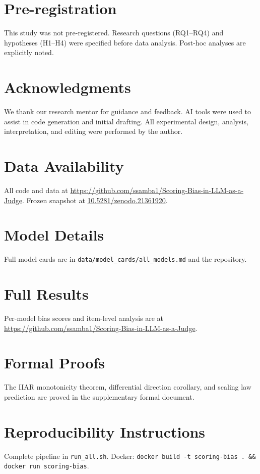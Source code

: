 \documentclass[11pt,a4paper]{article}
\begin{document}
\section*{Pre-registration}
This study was not pre-registered. Research questions (RQ1--RQ4) and hypotheses (H1--H4) were specified before data analysis. Post-hoc analyses are explicitly noted.

\section*{Acknowledgments}
We thank our research mentor for guidance and feedback. AI tools were used to assist in code generation and initial drafting. All experimental design, analysis, interpretation, and editing were performed by the author.

\section*{Data Availability}
All code and data at \url{https://github.com/ssamba1/Scoring-Bias-in-LLM-as-a-Judge}. Frozen snapshot at \href{https://doi.org/10.5281/zenodo.21361920}{10.5281/zenodo.21361920}.




\appendix
\section{Model Details}
\label{app:models}
Full model cards are in \texttt{data/model\_cards/all\_models.md} and the repository.

\section{Full Results}
\label{app:results}
Per-model bias scores and item-level analysis are at \url{https://github.com/ssamba1/Scoring-Bias-in-LLM-as-a-Judge}.

\section{Formal Proofs}
\label{app:proofs}
The IIAR monotonicity theorem, differential direction corollary, and scaling law prediction are proved in the supplementary formal document.

\section{Reproducibility Instructions}
\label{app:reproduce}
Complete pipeline in \texttt{run\_all.sh}. Docker: \texttt{docker build -t scoring-bias . \&\& docker run scoring-bias}.
\end{document}
